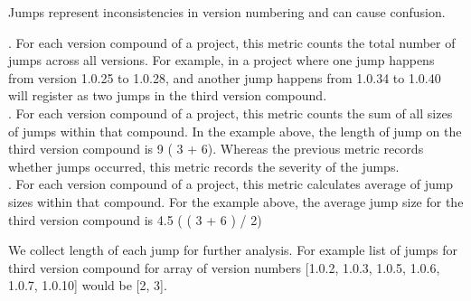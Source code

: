 \documentclass[conference]{IEEEtran}
\begin{document}
Jumps represent inconsistencies in version numbering and can cause confusion.
 
.  For each version compound of a project, this metric counts the total number of jumps across all versions. For example, in a project where one jump happens from version 1.0.25 to 1.0.28, and another jump happens from 1.0.34 to 1.0.40 will register as two jumps in the third version compound.\\

.  For each version compound of a project, this metric counts the sum of all sizes of jumps within that compound. 
In the example above, the length of jump on the third version compound is 
9 ( 3 + 6). Whereas the previous metric records whether jumps occurred, this metric records the severity of the jumps. \\
 
. For each version compound of a project, this metric calculates average of  jump sizes within that compound. For the example above, the average jump size for the third version compound is 4.5 ( ( 3 + 6 ) / 2)



We collect length of each jump for further analysis. For example list of jumps for third version compound for array of version numbers [1.0.2, 1.0.3, 1.0.5, 1.0.6, 1.0.7, 1.0.10] would be [2, 3]. 
\end{document}
